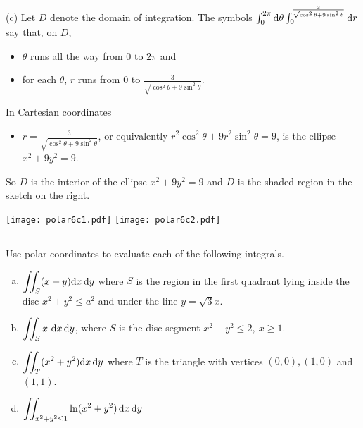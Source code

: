 \begin{solution}
(c)
Let $D$ denote the domain of integration. The symbols
$\int_0^{2\pi}\mathrm{d}\theta
     \int_0^{\frac{3}{\sqrt{\cos^2\theta+9\sin^2\theta}}}\mathrm{d}r$ 
say that, on $D$,
\begin{itemize}
\item 
$\theta$ runs all the way from $0$ to $2\pi$ and
\item 
for each $\theta$,
$r$ runs from $0$ to $\frac{3}{\sqrt{\cos^2\theta+9\sin^2\theta}}$.
\end{itemize}
In Cartesian coordinates
\begin{itemize}
\item 
$r=\frac{3}{\sqrt{\cos^2\theta+9\sin^2\theta}}$, or equivalently
$r^2\cos^2\theta+9r^2\sin^2\theta=9$, is the ellipse $x^2+9y^2=9$.
\end{itemize}
So $D$ is the interior of the ellipse $x^2+9y^2=9$
and $D$ is the shaded region in the sketch on the right.
\begin{center}
     \texttt{[image: polar6c1.pdf]}\qquad\qquad
     \texttt{[image: polar6c2.pdf]}
\end{center}

\end{solution}



\subsection*{\Procedural}

\begin{question}
Use polar coordinates to evaluate each of the following integrals.
\begin{enumerate}[(a)]
\item
$\displaystyle\iint_S (x+y)\mathrm{d}x\,\mathrm{d}y$ where $S$ is the region 
in the first quadrant lying inside the disc $x^2+y^2\le a^2$ and under 
the line $y=\sqrt{3}x$.
\item 
$\displaystyle\dblInt_Sx\ \dee{x}\,\dee{y}$, where $S$  is the disc segment
$x^2+y^2\le 2,\ x\ge 1$.
\item
$\displaystyle\iint_T (x^2+y^2)\mathrm{d}x\,\mathrm{d}y$ where $T$ is the triangle
with vertices $(0,0), (1,0)$ and $(1,1)$.
\item
$\displaystyle\iint_{x^2+y^2\le 1} \ln(x^2+y^2)\,\mathrm{d}x\,\mathrm{d}y$
\end{enumerate}
\end{question}

%

